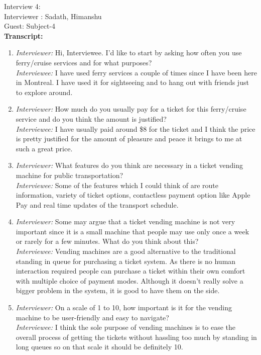 Interview 4:\\
Interviewer : Sadath, Himanshu \\
Guest: Subject-4\\
\textbf{Transcript:}
\begin{enumerate}
    \item \emph{Interviewer:} Hi, Interviewee. I'd like to start by asking how often you use ferry/cruise services and for what purposes?\\
\emph{Interviewee:} I have used ferry services a couple of times since I have been here in Montreal. I have used it for sightseeing and to hang out with friends just to explore around. 
    \item \emph{Interviewer:} How much do you usually pay for a ticket for this ferry/cruise service and do you think the amount is justified?\\
\emph{Interviewee:} I have usually paid around \$8 for the ticket and I think the price is pretty justified for the amount of pleasure and peace it brings to me at such a great price.
    \item \emph{Interviewer:} What features do you think are necessary in a ticket vending machine for public transportation?\\
\emph{Interviewee:} Some of the features which I could think of are route information, variety of ticket options, contactless payment option like Apple Pay and real time updates of the transport schedule.
    \item \emph{Interviewer:} Some may argue that a ticket vending machine is not very important since it is a small machine that people may use only once a week or rarely for a few minutes. What do you think about this?\\
\emph{Interviewee:} Vending machines are a good alternative to the traditional standing in queue for purchasing a ticket system. As there is no human interaction required people can purchase a ticket within their own comfort with multiple choice of payment modes. Although it doesn't really solve a bigger problem in the system, it is good to have them on the side.
    \item \emph{Interviewer:} On a scale of 1 to 10, how important is it for the vending machine to be user-friendly and easy to navigate? \\
\emph{Interviewee:} I think the sole purpose of vending machines is to ease the overall process of getting the tickets without hassling too much by standing in long queues so on that scale it should be definitely 10.

\end{enumerate}
